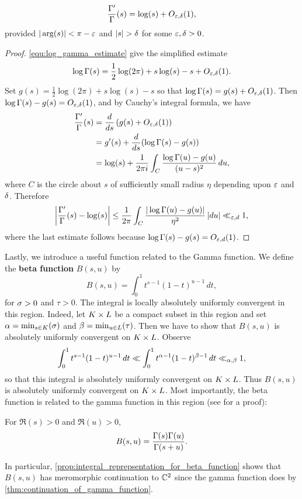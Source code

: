     \begin{proposition}\label{equ:approximtion_for_digamma}
    \[
      \frac{\Gamma'}{\Gamma}(s) = \log(s)+O_{\varepsilon,\delta}(1),
    \]
    provided $|\arg(s)| < \pi-\varepsilon$ and $|s| > \delta$ for some $\varepsilon,\delta > 0$.
    \end{proposition}
    \begin{proof}
      \cref{equ:log_gamma_estimate} give the simplified estimate
      \[
        \log\Gamma(s) = \frac{1}{2}\log(2\pi)+s\log(s)-s+O_{\varepsilon,\delta}(1).
      \]
      Set $g(s) = \frac{1}{2}\log(2\pi)+s\log(s)-s$ so that $\log\Gamma(s) = g(s)+O_{\varepsilon,\delta}(1)$. Then $\log\Gamma(s)-g(s) = O_{\varepsilon,\delta}(1)$, and by Cauchy's integral formula, we have
      \begin{align*}
        \frac{\Gamma'}{\Gamma}(s) &= \frac{d}{ds}\left(g(s)+O_{\varepsilon,\delta}(1)\right) \\
        &= g'(s)+\frac{d}{ds}(\log\Gamma(s)-g(s)) \\
        &= \log(s)+\frac{1}{2\pi i}\int_{C}\frac{\log\Gamma(u)-g(u)}{(u-s)^{2}}\,du,
      \end{align*}
      where $C$ is the circle about $s$ of sufficiently small radius $\eta$ depending upon $\varepsilon$ and $\delta$. Therefore
      \[
        \left|\frac{\Gamma'}{\Gamma}(s)-\log(s)\right| \le \frac{1}{2\pi}\int_{C}\frac{|\log\Gamma(u)-g(u)|}{\eta^{2}}\,|du| \ll_{\varepsilon,d} 1,
      \]
      where the last estimate follows because $\log\Gamma(s)-g(s) = O_{\varepsilon,d}(1)$.
    \end{proof}

    Lastly, we introduce a useful function related to the Gamma function. We define the \textbf{beta function} $B(s,u)$ by
    \[
        B(s,u) = \int_{0}^{1}t^{s-1}(1-t)^{u-1}\,dt,
    \]
    for $\sigma > 0$ and $\tau > 0$. The integral is locally absolutely uniformly convergent in this region. Indeed, let $K \times L$ be a compact subset in this region and set $\alpha = \min_{s \in K}(\sigma)$ and $\beta = \min_{u \in L}(\tau)$. Then we have to show that $B(s,u)$ is absolutely uniformly convergent on $K \times L$. Observe
    \[
      \int_{0}^{1}t^{s-1}(1-t)^{u-1}\,dt \ll \int_{0}^{1}t^{\alpha-1}(1-t)^{\beta-1}\,dt \ll_{\alpha,\beta} 1,
    \]
    so that this integral is absolutely uniformly convergent on $K \times L$. Thus $B(s,u)$ is absolutely uniformly convergent on $K \times L$. Most importantly, the beta function is related to the gamma function in this region (see \cite{remmert1998classical} for a proof):
    
    \begin{proposition}\label{prop:integral_reprepsentation_for_beta_function}
      For $\Re(s) > 0$ and $\Re(u) > 0$,
      \[
        B(s,u) = \frac{\Gamma(s)\Gamma(u)}{\Gamma(s+u)}.
      \]
    \end{proposition}

    In particular, \cref{prop:integral_reprepsentation_for_beta_function} shows that $B(s,u)$ has meromorphic continuation to $\mathbb{C}^{2}$ since the gamma function does by \cref{thm:continuation_of_gamma_function}.